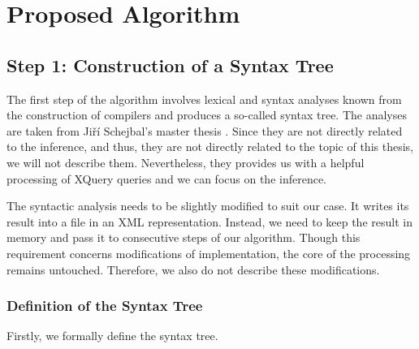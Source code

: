 \chapter{Proposed Algorithm}

\section{Step 1: Construction of a Syntax Tree}
The first step of the algorithm involves lexical and syntax analyses known from the construction of compilers and produces a so-called syntax tree. The analyses are taken from Ji\v r\'{i} Schejbal's master thesis . Since they are not directly related to the inference, and thus, they are not directly related to the topic of this thesis, we will not describe them. Nevertheless, they provides us with a helpful processing of XQuery queries and we can focus on the inference.

The syntactic analysis needs to be slightly modified to suit our case. It writes its result into a file in an XML representation. Instead, we need to keep the result in memory and pass it to consecutive steps of our algorithm. Though this requirement concerns modifications of implementation, the core of the processing remains untouched. Therefore, we also do not describe these modifications.


\subsection{Definition of the Syntax Tree}
Firstly, we formally define the syntax tree.

